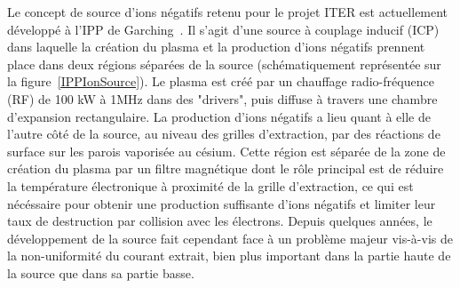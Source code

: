 \begin{refsection}
Le concept de source d'ions négatifs retenu pour le projet ITER est
actuellement développé à l'IPP de Garching~\parencite{Hemsworth}. Il s'agit
d'une source à couplage inducif (ICP) dans laquelle la création du plasma et la
production d'ions négatifs prennent place dans deux régions séparées de la
source (schématiquement représentée sur la
figure~\ref{IPPIonSource}). Le plasma est créé par un chauffage radio-fréquence
(RF) de 100 kW à 1MHz dans des "drivers", puis diffuse à travers une chambre
d'expansion rectangulaire. La production d'ions négatifs a lieu quant à elle de
l'autre côté de la source, au niveau des grilles d'extraction, par des
réactions de surface sur les parois vaporisée au césium.
Cette région est séparée de la zone de création du plasma par un filtre magnétique dont le rôle
principal est de réduire la température électronique à proximité de la grille
d'extraction, ce qui est nécéssaire pour obtenir une production suffisante
d'ions négatifs et limiter leur taux de destruction par collision avec les
électrons. 
Depuis quelques années, le développement de la source fait cependant face à un
problème majeur vis-à-vis de la non-uniformité du courant extrait, bien plus
important dans la partie haute de la source que dans sa partie basse. 


\end{refsection}
